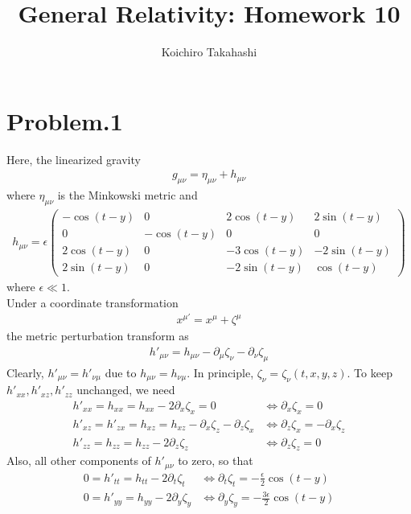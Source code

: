 \documentclass[12pt]{article}
\begin{document}
\title{General Relativity: Homework 10}
\author{Koichiro Takahashi}
\maketitle

\section*{Problem.1}
Here, the linearized gravity
\begin{align}
g_{\mu \nu} = \eta_{\mu \nu} + h_{\mu \nu}
\end{align}
where $\eta_{\mu \nu}$ is the Minkowski metric and
\begin{align}
h_{\mu \nu} = \epsilon
\begin{pmatrix}
- \cos\left(t - y\right) & 0 & 2 \cos\left(t - y\right) & 2 \sin\left(t - y\right)\\
0 & - \cos\left(t - y\right) & 0 & 0 \\
2 \cos\left(t - y\right) & 0 & -3 \cos\left(t - y\right) & -2 \sin\left(t - y\right) \\
2 \sin\left(t - y\right) & 0 & -2 \sin\left(t - y\right) & \cos\left(t - y\right)
\end{pmatrix}
\end{align}
where $\epsilon \ll 1$.\\
Under a coordinate transformation
\begin{align}
x^{\mu'} = x^{\mu} + \zeta^{\mu}
\end{align}
the metric perturbation transform as
\begin{align}
h'_{\mu \nu} = h_{\mu \nu} - \partial_{\mu} \zeta_{\nu} - \partial_{\nu} \zeta_{\mu}
\end{align}
Clearly, $h'_{\mu \nu} = h'_{\nu \mu}$ due to $h_{\mu \nu} = h_{\nu \mu}$. In principle, $\zeta_{\nu} = \zeta_{\nu}(t,x,y,z).$ To keep $h'_{xx}, h'_{xz}, h'_{zz}$ unchanged, we need
\begin{align}
h'_{xx}= h_{xx} = h_{xx} - 2 \partial_{x} \zeta_{x} = 0 &\Leftrightarrow \partial_{x} \zeta_{x} = 0 \\
h'_{xz} = h'_{zx} = h_{xz} = h_{xz} - \partial_{x} \zeta_{z} - \partial_{z} \zeta_{x} &\Leftrightarrow  \partial_{z} \zeta_{x} = - \partial_{x} \zeta_{z} \\
h'_{zz} = h_{zz} = h_{zz} - 2 \partial_{z} \zeta_{z} &\Leftrightarrow \partial_{z} \zeta_{z} = 0
\end{align}
Also, all other components of $h'_{\mu \nu}$ to zero, so that
\begin{align}
0 = h'_{t t} = h_{tt} - 2 \partial_{t} \zeta_{t} &\Leftrightarrow \partial_{t} \zeta_{t} = - \frac{\epsilon}{2} \cos\left(t - y\right) \\
0 = h'_{y y} = h_{yy} - 2 \partial_{y} \zeta_{y} &\Leftrightarrow \partial_{y} \zeta_{y} = - \frac{3 \epsilon}{2} \cos\left(t - y\right)
\end{align}
\end{document}
